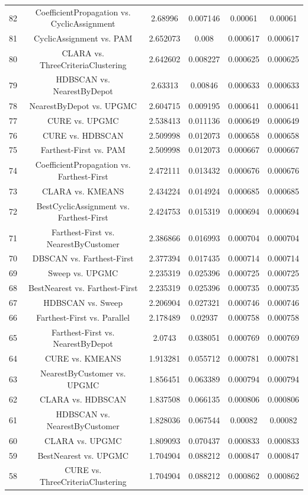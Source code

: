 \documentclass[a4paper,10pt]{article}
\begin{document}
\begin{landscape}
\begin{table}[!htp]
\begin{tabular}{cccccc}
82&CoefficientPropagation vs. CyclicAssignment&2.68996&0.007146&0.00061&0.00061\\
81&CyclicAssignment vs. PAM&2.652073&0.008&0.000617&0.000617\\
80&CLARA vs. ThreeCriteriaClustering&2.642602&0.008227&0.000625&0.000625\\
79&HDBSCAN vs. NearestByDepot&2.63313&0.00846&0.000633&0.000633\\
78&NearestByDepot vs. UPGMC&2.604715&0.009195&0.000641&0.000641\\
77&CURE vs. UPGMC&2.538413&0.011136&0.000649&0.000649\\
76&CURE vs. HDBSCAN&2.509998&0.012073&0.000658&0.000658\\
75&Farthest-First vs. PAM&2.509998&0.012073&0.000667&0.000667\\
74&CoefficientPropagation vs. Farthest-First&2.472111&0.013432&0.000676&0.000676\\
73&CLARA vs. KMEANS&2.434224&0.014924&0.000685&0.000685\\
72&BestCyclicAssignment vs. Farthest-First&2.424753&0.015319&0.000694&0.000694\\
71&Farthest-First vs. NearestByCustomer&2.386866&0.016993&0.000704&0.000704\\
70&DBSCAN vs. Farthest-First&2.377394&0.017435&0.000714&0.000714\\
69&Sweep vs. UPGMC&2.235319&0.025396&0.000725&0.000725\\
68&BestNearest vs. Farthest-First&2.235319&0.025396&0.000735&0.000735\\
67&HDBSCAN vs. Sweep&2.206904&0.027321&0.000746&0.000746\\
66&Farthest-First vs. Parallel&2.178489&0.02937&0.000758&0.000758\\
65&Farthest-First vs. NearestByDepot&2.0743&0.038051&0.000769&0.000769\\
64&CURE vs. KMEANS&1.913281&0.055712&0.000781&0.000781\\
63&NearestByCustomer vs. UPGMC&1.856451&0.063389&0.000794&0.000794\\
62&CLARA vs. HDBSCAN&1.837508&0.066135&0.000806&0.000806\\
61&HDBSCAN vs. NearestByCustomer&1.828036&0.067544&0.00082&0.00082\\
60&CLARA vs. UPGMC&1.809093&0.070437&0.000833&0.000833\\
59&BestNearest vs. UPGMC&1.704904&0.088212&0.000847&0.000847\\
58&CURE vs. ThreeCriteriaClustering&1.704904&0.088212&0.000862&0.000862\\

\end{tabular}
\end{table}
\end{landscape}
\end{document}
